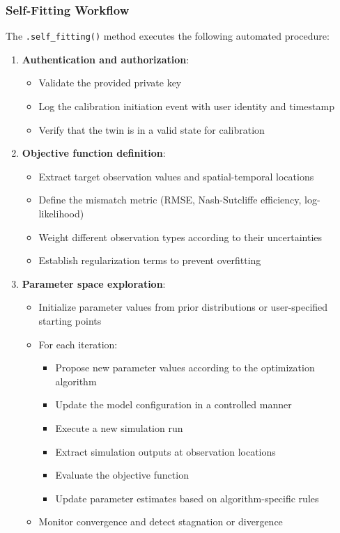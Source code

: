 \subsubsection{Self-Fitting Workflow}

The \texttt{.self\_fitting()} method executes the following automated procedure:

\begin{enumerate}
\item \textbf{Authentication and authorization}:
\begin{itemize}
    \item Validate the provided private key
    \item Log the calibration initiation event with user identity and timestamp
    \item Verify that the twin is in a valid state for calibration
\end{itemize}

\item \textbf{Objective function definition}:
\begin{itemize}
    \item Extract target observation values and spatial-temporal locations
    \item Define the mismatch metric (RMSE, Nash-Sutcliffe efficiency, log-likelihood)
    \item Weight different observation types according to their uncertainties
    \item Establish regularization terms to prevent overfitting
\end{itemize}

\item \textbf{Parameter space exploration}:
\begin{itemize}
    \item Initialize parameter values from prior distributions or user-specified starting points
    \item For each iteration:
    \begin{itemize}
        \item Propose new parameter values according to the optimization algorithm
        \item Update the model configuration in a controlled manner
        \item Execute a new simulation run
        \item Extract simulation outputs at observation locations
        \item Evaluate the objective function
        \item Update parameter estimates based on algorithm-specific rules
    \end{itemize}
    \item Monitor convergence and detect stagnation or divergence
\end{itemize}


\end{enumerate}
